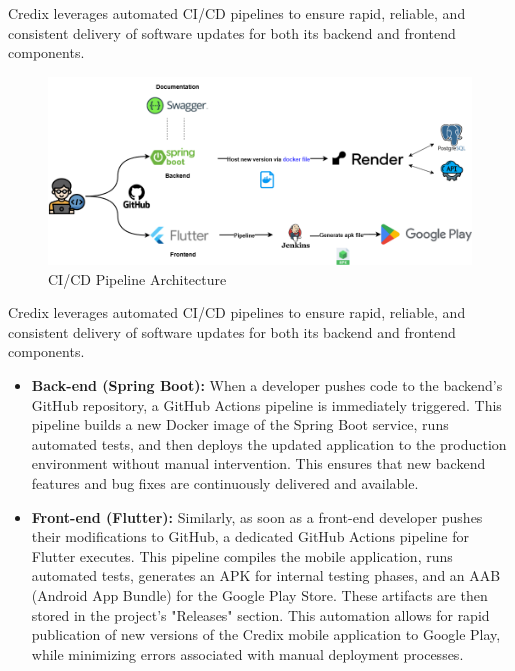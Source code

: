 Credix leverages automated CI/CD pipelines to ensure rapid, reliable, and consistent delivery of software updates for both its backend and frontend components.

\begin{figure}[H]
    \centering
    \includegraphics[width=\textwidth]{images/ci_cd_pipeline_diagram.png}
    \caption{CI/CD Pipeline Architecture}
    \label{fig:cicd_pipeline}
\end{figure}

Credix leverages automated CI/CD pipelines to ensure rapid, reliable, and consistent delivery of software updates for both its backend and frontend components.

\begin{itemize}
    \item \textbf{Back-end (Spring Boot):}
    When a developer pushes code to the backend's GitHub repository, a GitHub Actions pipeline is immediately triggered. This pipeline builds a new Docker image of the Spring Boot service, runs automated tests, and then deploys the updated application to the production environment without manual intervention. This ensures that new backend features and bug fixes are continuously delivered and available.

    \item \textbf{Front-end (Flutter):}
    Similarly, as soon as a front-end developer pushes their modifications to GitHub, a dedicated GitHub Actions pipeline for Flutter executes. This pipeline compiles the mobile application, runs automated tests, generates an APK for internal testing phases, and an AAB (Android App Bundle) for the Google Play Store. These artifacts are then stored in the project's "Releases" section. This automation allows for rapid publication of new versions of the Credix mobile application to Google Play, while minimizing errors associated with manual deployment processes.
\end{itemize}
